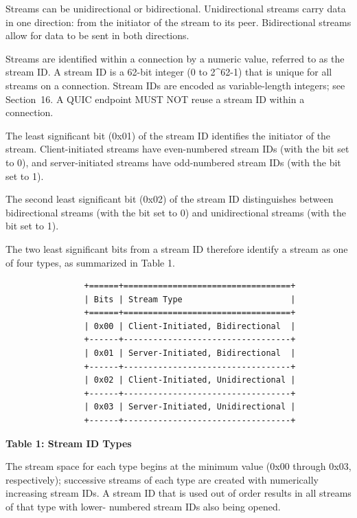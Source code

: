 \documentclass{article}
\begin{document}
Streams can be unidirectional or bidirectional.  Unidirectional streams carry data in one direction: from the initiator of the stream to its peer.  Bidirectional streams allow for data to be sent in both directions.

Streams are identified within a connection by a numeric value, referred to as the stream ID.  A stream ID is a 62-bit integer (0 to 2\textasciicircum{}62-1) that is unique for all streams on a connection.  Stream IDs are encoded as variable-length integers; see Section~16.  A QUIC endpoint MUST NOT reuse a stream ID within a connection.

The least significant bit (0x01) of the stream ID identifies the initiator of the stream.  Client-initiated streams have even-numbered stream IDs (with the bit set to 0), and server-initiated streams have odd-numbered stream IDs (with the bit set to 1).

The second least significant bit (0x02) of the stream ID distinguishes between bidirectional streams (with the bit set to 0) and unidirectional streams (with the bit set to 1).

The two least significant bits from a stream ID therefore identify a stream as one of four types, as summarized in Table 1.

\begin{verbatim}
                +======+==================================+
                | Bits | Stream Type                      |
                +======+==================================+
                | 0x00 | Client-Initiated, Bidirectional  |
                +------+----------------------------------+
                | 0x01 | Server-Initiated, Bidirectional  |
                +------+----------------------------------+
                | 0x02 | Client-Initiated, Unidirectional |
                +------+----------------------------------+
                | 0x03 | Server-Initiated, Unidirectional |
                +------+----------------------------------+
\end{verbatim}

\begin{center}
\textbf{Table 1: Stream ID Types}
\end{center}

The stream space for each type begins at the minimum value (0x00 through 0x03, respectively); successive streams of each type are created with numerically increasing stream IDs.  A stream ID that is used out of order results in all streams of that type with lower- numbered stream IDs also being opened.
\end{document}
